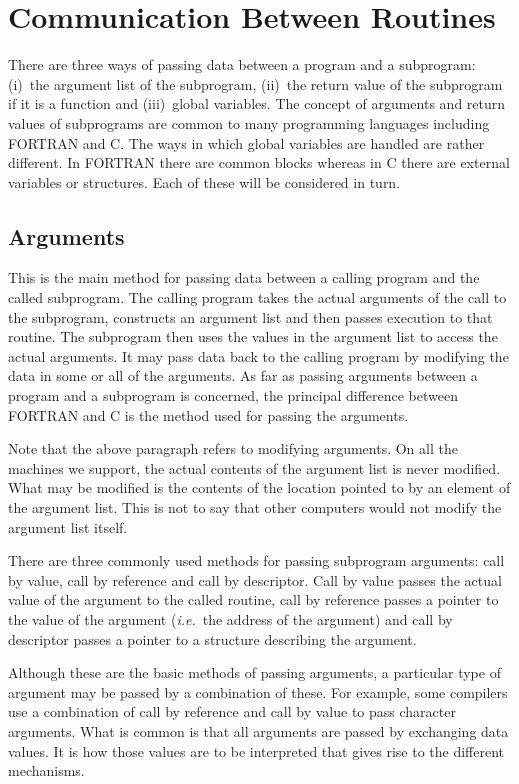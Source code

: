 \documentclass[twoside,11pt,nolof]{starlink}
\begin{document}
\section{Communication Between Routines}

There are three ways of passing data between a program and a subprogram:
(i)~the argument list of the subprogram, (ii)~the return value of the
subprogram if it is a function and (iii)~global variables. The concept of
arguments and return values of subprograms are common to many programming
languages including FORTRAN and C\@. The ways in which global variables are
handled are rather different. In FORTRAN there are common blocks whereas in C
there are external variables or structures. Each of these will be considered in
turn.

\subsection{\label{args}Arguments}

This is the main method for passing data between a calling program and the
called subprogram. The calling program takes the actual arguments of the call
to the  subprogram, constructs an argument list and then passes execution to
that routine. The subprogram then uses the values in the argument list to
access the actual arguments. It may pass data back to the calling program by
modifying the data in some or all of the arguments. As far as passing arguments
between a program and a subprogram is concerned, the principal difference
between FORTRAN and C is the method used for passing the arguments.

Note that the above paragraph refers to modifying arguments.
On all the machines we support, the actual contents of the argument list is
never modified.
What may be modified is the contents of the location pointed to by an element
of the argument list. This is not to say that other computers would not modify
the argument list itself.

There are three commonly used methods for passing subprogram arguments: call by
value, call by reference and call by descriptor. Call by value passes the
actual value of the argument to the called routine, call by reference passes a
pointer to the value of the argument (\textit{i.e.}\ the address of the
argument) and call by descriptor passes a pointer to a structure describing
the argument.

Although these are the basic methods of passing arguments, a particular type of
argument may be passed by a combination of these. For example, some compilers
use a combination of call by reference and call by value to pass character
arguments.
What is common is that all arguments are passed by exchanging data values.
It is how those values are to be interpreted that gives rise to the different
mechanisms.
\end{document}
